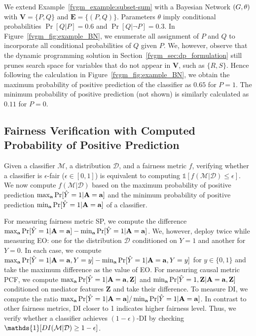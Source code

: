  	 
	\begin{example}
		\normalfont
		We extend Example~\ref{fvgm_example:subset-sum} with a Bayesian Network $ (G, \theta) $ with $ \mathbf{V} = \{P, Q\} $ and $ \mathbf{E} = \{(P,Q)\} $. Parameters $ \theta $ imply conditional probabilities $ \Pr[Q|P] = 0.6 $ and $ \Pr[Q|\neg P] = 0.3 $. 	In Figure~\ref{fvgm_fig:example_BN}, we enumerate all  assignment of $ P $ and $ Q $ to  incorporate all conditional probabilities of $ Q $ given $ P $. We, however, observe that the dynamic programming solution in Section~\ref{fvgm_sec:dp_formulation} still prunes search space for variables that do not appear in $ \mathbf{V} $, such as $ \{R, S\} $. Hence following the calculation in Figure~\ref{fvgm_fig:example_BN}, we obtain the maximum probability of positive prediction of the classifier as $ 0.65 $ for $ P = 1 $. The minimum probability of positive prediction (not shown)  is similarly calculated as $ 0.11 $ for $ P = 0 $. 
	\end{example}


	\subsection{Fairness Verification with Computed Probability of Positive Prediction} 
	Given a classifier $\mathcal{M}$, a  distribution $\mathcal{D}$, and a fairness metric $f$, verifying whether a classifier is $\epsilon$-fair ($\epsilon \in [0,1]$) is equivalent to computing $\mathds{1}[f(\mathcal{M}|\mathcal{D})\leq \epsilon]$. We now compute $f(\mathcal{M}|\mathcal{D})$ based on the maximum probability of positive prediction $ \max_{ \mathbf{a}} \Pr[\hat{Y} =1 | \mathbf{A} = \mathbf{a}] $ and the  minimum probability of positive prediction $ \min_{ \mathbf{a}} \Pr[\hat{Y} =1 | \mathbf{A} = \mathbf{a}] $ of a classifier.
	
	For measuring fairness metric SP, we compute the difference $ \max_{ \mathbf{a}} \Pr[\hat{Y} =1 | \mathbf{A} = \mathbf{a}]  - \min_{ \mathbf{a}} \Pr[\hat{Y} =1 | \mathbf{A} = \mathbf{a}] $. We, however, deploy {\fvgm} twice while measuring EO: one for the distribution $ \mathcal{D} $ conditioned on $ Y = 1  $ and another for $ Y = 0 $. 
	In each case, we compute $ \max_{ \mathbf{a}} \Pr[\hat{Y} =1 | \mathbf{A} = \mathbf{a}, Y = y ]  - \min_{ \mathbf{a}} \Pr[\hat{Y} =1 | \mathbf{A} = \mathbf{a}, Y = y ] $ for $ y \in \{0,1\} $ and take the  maximum difference as the value of EO.  
	For measuring causal metric PCF, we compute  $ \max_{ \mathbf{a}} \Pr[\hat{Y} =1 | \mathbf{A} = \mathbf{a}, \mathbf{Z}] $ and  $ \min_{ \mathbf{a}} \Pr[\hat{Y} =1, \mathbf{Z}| \mathbf{A} = \mathbf{a} , \mathbf{Z}] $ conditioned on mediator features $ \mathbf{Z} $ and take their difference. 
	To measure DI, we compute the ratio $ \max_{ \mathbf{a}} \Pr[\hat{Y} =1 | \mathbf{A} = \mathbf{a}] / \min_{ \mathbf{a}} \Pr[\hat{Y} =1 | \mathbf{A} = \mathbf{a}] $. In contrast to other fairness metrics, DI closer to 1 indicates higher fairness level. Thus, we verify whether a classifier achieves $(1 - \epsilon)$-DI by checking $ \mathds{1}[DI(\alg| \mathcal{D}) \ge 1 - \epsilon] $. 
	
